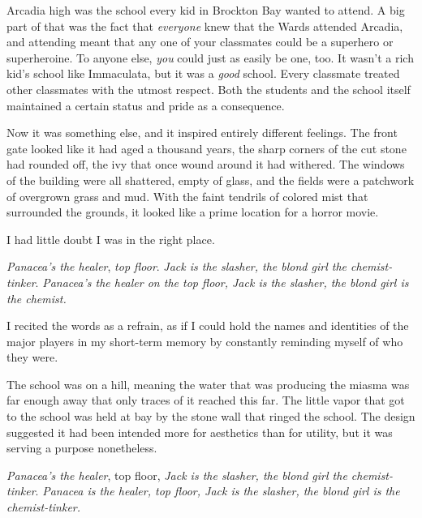 





Arcadia high was the school every kid in Brockton Bay wanted to attend.  A big part of that was the fact that \emph{everyone} knew that the Wards attended Arcadia, and attending meant that any one of your classmates could be a superhero or superheroine.  To anyone else, \emph{you} could just as easily be one, too.  It wasn't a rich kid's school like Immaculata, but it was a \emph{good} school.  Every classmate treated other classmates with the utmost respect.  Both the students and the school itself maintained a certain status and pride as a consequence.



Now it was something else, and it inspired entirely different feelings.  The front gate looked like it had aged a thousand years, the sharp corners of the cut stone had rounded off, the ivy that once wound around it had withered.  The windows of the building were all shattered, empty of glass, and the fields were a patchwork of overgrown grass and mud.  With the faint tendrils of colored mist that surrounded the grounds, it looked like a prime location for a horror movie.



I had little doubt I was in the right place.



\emph{Panacea's the healer}, \emph{top floor}.  \emph{Jack is the slasher, the blond girl the chemist-tinker}.  \emph{Panacea's the healer on the top floor, Jack is the slasher, the blond girl is the chemist.}



I recited the words as a refrain, as if I could hold the names and identities of the major players in my short-term memory by constantly reminding myself of who they were.



The school was on a hill, meaning the water that was producing the miasma was far enough away that only traces of it reached this far.  The little vapor that got to the school was held at bay by the stone wall that ringed the school.  The design suggested it had been intended more for aesthetics than for utility, but it was serving a purpose nonetheless.



\emph{Panacea's the healer}, top floor, \emph{Jack is the slasher, the blond girl the chemist-tinker}.  \emph{Panacea is the healer, top floor, Jack is the slasher, the blond girl is the chemist-tinker.}




